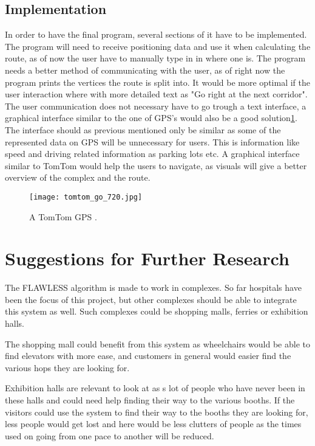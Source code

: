 \subsection{Implementation}

In order to have the final program, several sections of it have to be implemented. The program will need to receive positioning data and use it when calculating the route, as of now the user have to manually type in in where one is. The program needs a better method of communicating with the user, as of right now the program prints the vertices the route is split into. It would be more optimal if the user interaction where with more detailed text as "Go right at the next corridor". The user communication does not necessary have to go trough a text interface, a graphical interface similar to the one of GPS's would also be a good solution\cref{fig:TomTom}. The interface should as previous mentioned only be similar as some of the represented data on GPS will be unnecessary for users. This is information like speed and driving related information as parking lots etc. A graphical interface similar to TomTom would help the users to navigate, as visuals will give a better overview of the complex and the route. 

\begin{figure}
\centering
    \texttt{[image: tomtom\_go\_720.jpg]}
    \caption{A TomTom GPS \cite{diss_tomtom}.} \label{fig:TomTom}
\end{figure}


\section{Suggestions for Further Research}

The FLAWLESS algorithm is made to work in complexes. So far hospitals have been the focus of this project, but other complexes should be able to integrate this system as well. Such complexes could be shopping malls, ferries or exhibition halls. 

The shopping mall could benefit from this system as wheelchairs would be able to find elevators with more ease, and customers in general would easier find the various hops they are looking for. 

Exhibition halls are relevant to look at as s lot of people who have never been in these halls and could need help finding their way to the various booths. If the visitors could use the system to find their way to the booths they are looking for, less people would get lost and here would be less clutters of people as the times used on going from one pace to another will be reduced. 
\newline 

